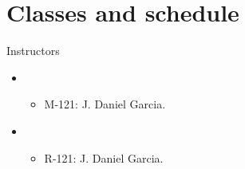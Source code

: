 \section{Classes and schedule}

\begin{frame}[t]{Instructors}
\begin{itemize}
  \item {}
    \begin{itemize}
      \item M-121: J. Daniel Garcia.
    \end{itemize}
  \item {}
    \begin{itemize}
      \item R-121: J. Daniel Garcia.
    \end{itemize}
\end{itemize}
\end{frame}

